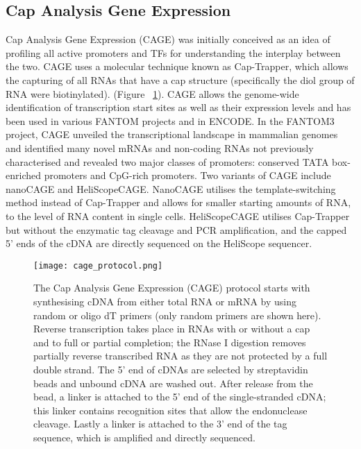 \subsection{Cap Analysis Gene Expression}

Cap Analysis Gene Expression (CAGE) was initially conceived as an idea of profiling all active promoters and TFs for understanding the interplay between the two\cite{carninci2010capanalysis}. CAGE uses a molecular technique known as Cap-Trapper\cite{pmid8938445,pmid9179497}, which allows the capturing of all RNAs that have a cap structure (specifically the diol group of RNA were biotinylated). (Figure ~\ref{fig:cage_protocol}). CAGE allows the genome-wide identification of transcription start sites as well as their expression levels and has been used in various FANTOM projects\cite{pmid16141072, pmid19377474, pmid24670764} and in ENCODE\cite{pmid17571346, pmid22955620}. In the FANTOM3 project, CAGE unveiled the transcriptional landscape in mammalian genomes\cite{pmid16141072} and identified many novel mRNAs and non-coding RNAs not previously characterised and revealed two major classes of promoters: conserved TATA box-enriched promoters and CpG-rich promoters\cite{pmid16645617}. Two variants of CAGE include nanoCAGE\cite{pmid20543846} and HeliScopeCAGE\cite{pmid21596820}. NanoCAGE utilises the template-switching method\cite{pmid11314272} instead of Cap-Trapper and allows for smaller starting amounts of RNA, to the level of RNA content in single cells. HeliScopeCAGE utilises Cap-Trapper but without the enzymatic tag cleavage and PCR amplification, and the capped 5' ends of the cDNA are directly sequenced on the HeliScope sequencer.

\begin{figure}[!ht]
   \centering
   \texttt{[image: cage\_protocol.png]}
   \caption[Cap Analysis Gene Expression protocol]{The Cap Analysis Gene Expression (CAGE) protocol starts with synthesising cDNA from either total RNA or mRNA by using random or oligo dT primers (only random primers are shown here). Reverse transcription takes place in RNAs with or without a cap and to full or partial completion; the RNase I digestion removes partially reverse transcribed RNA as they are not protected by a full double strand. The 5' end of cDNAs are selected by streptavidin beads and unbound cDNA are washed out. After release from the bead, a linker is attached to the 5' end of the single-stranded cDNA; this linker contains recognition sites that allow the endonuclease cleavage. Lastly a linker is attached to the 3' end of the tag sequence, which is amplified and directly sequenced.}
   \label{fig:cage_protocol}
\end{figure}

